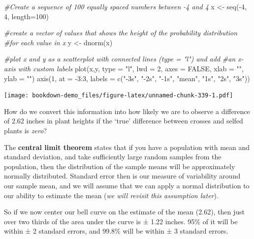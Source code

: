 \documentclass[
]{book}
\newenvironment{Shaded}{\begin{snugshade}}{\end{snugshade}}
\newcommand{\AttributeTok}[1]{\textcolor[rgb]{0.77,0.63,0.00}{#1}}
\newcommand{\CommentTok}[1]{\textcolor[rgb]{0.56,0.35,0.01}{\textit{#1}}}
\newcommand{\ConstantTok}[1]{\textcolor[rgb]{0.00,0.00,0.00}{#1}}
\newcommand{\DecValTok}[1]{\textcolor[rgb]{0.00,0.00,0.81}{#1}}
\newcommand{\FunctionTok}[1]{\textcolor[rgb]{0.00,0.00,0.00}{#1}}
\newcommand{\NormalTok}[1]{#1}
\newcommand{\OtherTok}[1]{\textcolor[rgb]{0.56,0.35,0.01}{#1}}
\newcommand{\SpecialCharTok}[1]{\textcolor[rgb]{0.00,0.00,0.00}{#1}}
\newcommand{\StringTok}[1]{\textcolor[rgb]{0.31,0.60,0.02}{#1}}
\begin{document}
\begin{Shaded}
\begin{Highlighting}[]
\CommentTok{\#Create a sequence of 100 equally spaced numbers between {-}4 and 4}
\NormalTok{x }\OtherTok{\textless{}{-}} \FunctionTok{seq}\NormalTok{(}\SpecialCharTok{{-}}\DecValTok{4}\NormalTok{, }\DecValTok{4}\NormalTok{, }\AttributeTok{length=}\DecValTok{100}\NormalTok{)}

\CommentTok{\#create a vector of values that shows the height of the probability distribution}
\CommentTok{\#for each value in x}
\NormalTok{y }\OtherTok{\textless{}{-}} \FunctionTok{dnorm}\NormalTok{(x)}

\CommentTok{\#plot x and y as a scatterplot with connected lines (type = "l") and add}
\CommentTok{\#an x{-}axis with custom labels}
\FunctionTok{plot}\NormalTok{(x,y, }\AttributeTok{type =} \StringTok{"l"}\NormalTok{, }\AttributeTok{lwd =} \DecValTok{2}\NormalTok{, }\AttributeTok{axes =} \ConstantTok{FALSE}\NormalTok{, }\AttributeTok{xlab =} \StringTok{""}\NormalTok{, }\AttributeTok{ylab =} \StringTok{""}\NormalTok{)}
\FunctionTok{axis}\NormalTok{(}\DecValTok{1}\NormalTok{, }\AttributeTok{at =} \SpecialCharTok{{-}}\DecValTok{3}\SpecialCharTok{:}\DecValTok{3}\NormalTok{, }\AttributeTok{labels =} \FunctionTok{c}\NormalTok{(}\StringTok{"{-}3s"}\NormalTok{, }\StringTok{"{-}2s"}\NormalTok{, }\StringTok{"{-}1s"}\NormalTok{, }\StringTok{"mean"}\NormalTok{, }\StringTok{"1s"}\NormalTok{, }\StringTok{"2s"}\NormalTok{, }\StringTok{"3s"}\NormalTok{))}
\end{Highlighting}
\end{Shaded}

\texttt{[image: bookdown-demo\_files/figure-latex/unnamed-chunk-339-1.pdf]}

How do we convert this information into how likely we are to observe a difference of 2.62 inches in plant heights if the `true' difference between crosses and selfed plants is \emph{zero}?

The \textbf{central limit theorem} states that if you have a population with mean and standard deviation, and take sufficiently large random samples from the population, then the distribution of the sample means will be approximately normally distributed. Standard error then is our measure of variability around our sample mean, and we will assume that we can apply a normal distribution to our ability to estimate the mean (\emph{we will revisit this assumption later}).

So if we now center our bell curve on the estimate of the mean (2.62), then just over two thirds of the area under the curve is ± 1.22 inches. 95\% of it will be within ± 2 standard errors, and 99.8\% will be within ± 3 standard errors.
\end{document}
